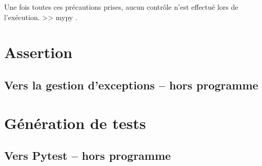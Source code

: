 Une fois toutes ces précautions prises, aucun contrôle n'est effectué lors de l'exécution. >> mypy .

\section{Assertion}

\subsection{Vers la gestion d'exceptions -- hors programme}


\section{Génération de tests}


\subsection{Vers Pytest -- hors programme}


